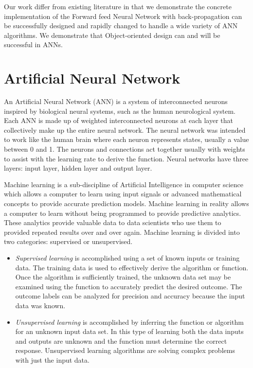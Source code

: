 \documentclass[journal]{IEEEtran}
\begin{document}
Our work differ from existing literature in that we demonstrate the concrete implementation of the Forward feed Neural Network with back-propagation can be successfully designed and rapidly changed to handle a wide variety of ANN algorithms.  We demonstrate that Object-oriented design can and will be successful in ANNs.


\section{Artificial Neural Network}
An Artificial Neural Network (ANN) is a system of interconnected neurons inspired by biological neural systems, such as the human neurological system.  Each ANN is made up of weighted interconnected neurons at each layer that collectively make up the entire neural network.  The neural network was intended to work like the human brain where each neuron represents states, usually a value between 0 and 1.  The neurons and connections act together usually with weights to assist with the learning rate to derive the function.  Neural networks have three layers:%
input layer, hidden layer and output layer. 

Machine learning is a sub-discipline of Artificial Intelligence in computer science which allows a computer to learn using input signals or advanced mathematical concepts to provide accurate prediction models.  Machine learning in reality allows a computer to learn without being programmed to provide predictive analytics.  These analytics provide valuable data to data scientists who use them to provided repeated results over and over again.  Machine learning is divided into two categories: supervised or unsupervised.

\begin{itemize}
    \item \textit{Supervised learning} is accomplished using a set of known inputs or training data.  The training data is used to effectively derive the algorithm or function.  Once the algorithm is sufficiently trained, the unknown data set may be examined using the function to accurately predict the desired outcome.  The outcome labels can be analyzed for precision and accuracy because the input data was known. 
    \item \textit{Unsupervised learning} is accomplished by inferring the function or algorithm for an unknown input data set.  In this type of learning both the data inputs and outputs are unknown and the function must determine the correct response.  Unsupervised learning algorithms are solving complex problems with just the input data.
\end{itemize}
\end{document}
